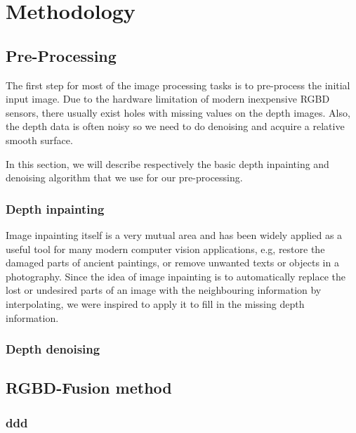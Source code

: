 \chapter{Methodology} \label{chap:methodology}

\section{Pre-Processing}
The first step for most of the image processing tasks is to pre-process the initial input image. 
Due to the hardware limitation of modern inexpensive RGBD sensors, there usually exist holes with missing values on the depth images. 
Also, the depth data is often noisy so we need to do denoising and acquire a relative smooth surface.

In this section, we will describe respectively the basic depth inpainting and denoising algorithm that we use for our pre-processing. 
\subsection{Depth inpainting}
Image inpainting itself is a very mutual area and has been widely applied as a useful tool for many modern computer vision applications, e.g, restore the damaged parts of ancient paintings, or remove unwanted texts or objects in a photography. 
Since the idea of image inpainting is to automatically replace the lost or undesired parts of an image with the neighbouring information by interpolating, we were inspired to apply it to fill in the missing depth information.



\subsection{Depth denoising}


\section{RGBD-Fusion method}

\subsection{ddd}


